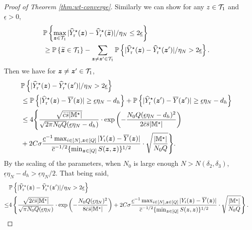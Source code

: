 \documentclass[12pt]{article}
\begin{document}
\begin{proof}[Proof of Theorem \ref{thm:wt-converge}]
Similarly we can show for any $z\in{\mathcal{T}}_{1}$ and $\underline{\epsilon}>0$,
\begin{align*} 
    &{\mathbb{P}}\left\{\max_{{\boldsymbol{z}}\in{\mathcal{T}}_{1}}|{\widehat{Y}}^\star_{\operatorname{r}}({\boldsymbol{z}}) - {\widehat{Y}}^\star_{\operatorname{r}}(\widetilde{{\boldsymbol{z}}})|/\eta_N \le 2\underline{\epsilon}\right\} \\
    & \ge {\mathbb{P}}\left\{\widetilde{{\boldsymbol{z}}}\in{\mathcal{T}}_{1}\right\}  
     - \sum_{{\boldsymbol{z}}\neq {\boldsymbol{z}}'\in{\mathcal{T}}_{1}}{\mathbb{P}}\left\{|{\widehat{Y}}^\star_{\operatorname{r}}({\boldsymbol{z}}) - {\widehat{Y}}^\star_{\operatorname{r}}({{\boldsymbol{z}}'})|/\eta_N > 2\underline{\epsilon}\right\}.\notag
\end{align*}
Then we have for ${\boldsymbol{z}}\neq {\boldsymbol{z}}'\in{\mathcal{T}}_{1}$,
\begin{align*}
    &{\mathbb{P}}\left\{|{\widehat{Y}}^\star_{\operatorname{r}}({\boldsymbol{z}}) - {\widehat{Y}}^\star_{\operatorname{r}}({{\boldsymbol{z}}'})|/\eta_N > 2\underline{\epsilon}\right\} \\
    & \le {\mathbb{P}}\left\{|{\widehat{Y}}^\star_{\operatorname{r}}({\boldsymbol{z}})-\overline{Y}({\boldsymbol{z}})|\ge  {\underline{\epsilon}\eta_N - d_h}   \right\} + {\mathbb{P}}\left\{|{\widehat{Y}}^\star_{\operatorname{r}}({\boldsymbol{z}}') - \overline{Y}({{\boldsymbol{z}}'})|\ge  {\underline{\epsilon}\eta_N - d_h}   \right\}\\
    &\le 4\Bigg\{ \frac{\sqrt{\bar{c}\bar{s}|{\mathbb{M}}^\star|}}{\sqrt{2\pi N_0Q }({\underline{\epsilon}\eta_N - d_h})}\cdot \exp\left(-\frac{ N_0Q ({\underline{\epsilon}\eta_N - d_h})^{  2}}{2\bar{c}\bar{s}|{\mathbb{M}}^\star|}\right)\\
    &+ 2C\sigma   \frac{ \underline{c}^{-1} \max_{i\in[N],{\boldsymbol{z}}\in[Q]}|Y_i({\boldsymbol{z}})-\overline{Y}({\boldsymbol{z}})|}{ {\overline{c}^{-1/2} \{\min_{{\boldsymbol{z}}\in[Q]} S({\boldsymbol{z}},{\boldsymbol{z}})}\}^{1/2}}\cdot \sqrt{\frac{|{\mathbb{M}}^\star|}{N_0Q}}\Bigg\}.
\end{align*}
By the scaling of the parameters, when $N_0$ is large enough $N>N(\delta_2,\delta_3)$, $\underline{\epsilon}\eta_N-d_h >\underline{\epsilon}\eta_N/2$. That being said,
\begin{align*}
    &{\mathbb{P}}\left\{|{\widehat{Y}}^\star_{\operatorname{r}}({\boldsymbol{z}}) - {\widehat{Y}}^\star_{\operatorname{r}}({{\boldsymbol{z}}'})|/\eta_N > 2\underline{\epsilon}\right\} \\
    \le & 4\left\{ \frac{\sqrt{2\bar{c}\bar{s} |{\mathbb{M}}^\star|}}{\sqrt{\pi N_0Q }({\underline{\epsilon}\eta_N})}\cdot \exp\left(-\frac{ N_0Q ({\underline{\epsilon}\eta_N})^{  2}}{8\bar{c}\bar{s} |{\mathbb{M}}^\star|}\right)
    +  2C\sigma   \frac{ \underline{c}^{-1} \max_{i\in[N],{\boldsymbol{z}}\in[Q]}|Y_i({\boldsymbol{z}})-\overline{Y}({\boldsymbol{z}})|}{ {\overline{c}^{-1/2} \{\min_{{\boldsymbol{z}}\in[Q]} S({\boldsymbol{z}},{\boldsymbol{z}})}\}^{1/2}}\cdot \sqrt{\frac{|{\mathbb{M}}^\star|}{N_0Q}}\right\}.
\end{align*}


\end{proof}
\end{document}
